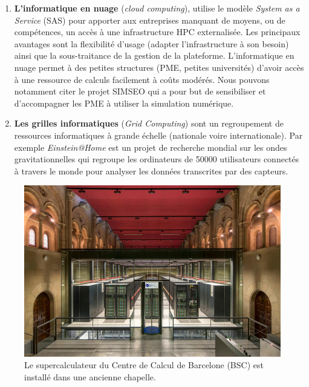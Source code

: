 \begin{enumerate}
        \item \textbf{L'informatique en nuage} (\textit{cloud computing}),  utilise le modèle \textit{System as a Service} (SAS) pour apporter aux entreprises manquant de moyens, ou de compétences, un accès à une infrastructure HPC externalisée. Les principaux avantages sont la flexibilité d'usage (adapter l'infrastructure à son besoin) ainsi que la sous-traitance de la gestion de la plateforme. L'informatique en nuage permet  à des petites structures (PME, petites universités) d'avoir accès à une ressource de calculs facilement à coûts modérés. Nous pouvons notamment citer le projet SIMSEO \cite{Saguez2016} qui a pour but de sensibiliser et d'accompagner les PME à utiliser la simulation numérique. %
        
        \item \textbf{Les grilles informatiques} (\textit{Grid Computing}) sont un regroupement de ressources informatiques à grande échelle (nationale voire internationale). Par exemple \textit{Einstein@Home} \cite{Abbott2009} est un projet de recherche mondial sur les ondes gravitationnelles  qui regroupe les ordinateurs de 50000 utilisateurs connectés à travers le monde pour analyser les données transcrites par des capteurs.
    \end{enumerate}
        
        
        \begin{figure}
        \center
        \includegraphics[width=12cm]{images/hpc_bsc_super.jpg}
        \caption{\label{fig:hpc_bsc_super} Le supercalculateur du Centre de Calcul de Barcelone (BSC) est installé dans une ancienne chapelle.}
        \end{figure}
        
